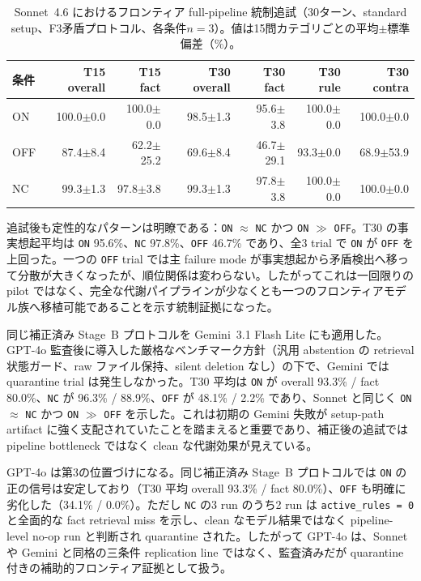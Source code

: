 \documentclass[11pt,a4paper]{article}
\begin{document}
\begin{table}[htbp]
\centering
\caption{Sonnet~4.6 におけるフロンティア full-pipeline 統制追試（30ターン、standard setup、F3矛盾プロトコル、各条件$n = 3$）。値は15問カテゴリごとの平均$\pm$標準偏差（\%）。}
\label{tab:frontier_pipeline}
\small
\begin{tabular}{lrrrrrr}
\toprule
条件 & T15 overall & T15 fact & T30 overall & T30 fact & T30 rule & T30 contra \\
\midrule
ON & 100.0$\pm$0.0 & 100.0$\pm$0.0 & 98.5$\pm$1.3 & 95.6$\pm$3.8 & 100.0$\pm$0.0 & 100.0$\pm$0.0 \\
OFF & 87.4$\pm$8.4 & 62.2$\pm$25.2 & 69.6$\pm$8.4 & 46.7$\pm$29.1 & 93.3$\pm$0.0 & 68.9$\pm$53.9 \\
NC & 99.3$\pm$1.3 & 97.8$\pm$3.8 & 99.3$\pm$1.3 & 97.8$\pm$3.8 & 100.0$\pm$0.0 & 100.0$\pm$0.0 \\
\bottomrule
\end{tabular}
\end{table}

追試後も定性的なパターンは明瞭である：\texttt{ON} $\approx$ \texttt{NC} かつ \texttt{ON} $\gg$ \texttt{OFF}。T30 の事実想起平均は \texttt{ON} 95.6\%、\texttt{NC} 97.8\%、\texttt{OFF} 46.7\% であり、全3 trial で \texttt{ON} が \texttt{OFF} を上回った。一つの \texttt{OFF} trial では主 failure mode が事実想起から矛盾検出へ移って分散が大きくなったが、順位関係は変わらない。したがってこれは一回限りの pilot ではなく、完全な代謝パイプラインが少なくとも一つのフロンティアモデル族へ移植可能であることを示す統制証拠になった。

同じ補正済み Stage~B プロトコルを Gemini~3.1 Flash Lite にも適用した。GPT-4o 監査後に導入した厳格なベンチマーク方針（汎用 abstention の retrieval 状態ガード、raw ファイル保持、silent deletion なし）の下で、Gemini では quarantine trial は発生しなかった。T30 平均は \texttt{ON} が overall 93.3\% / fact 80.0\%、\texttt{NC} が 96.3\% / 88.9\%、\texttt{OFF} が 48.1\% / 2.2\% であり、Sonnet と同じく \texttt{ON} $\approx$ \texttt{NC} かつ \texttt{ON} $\gg$ \texttt{OFF} を示した。これは初期の Gemini 失敗が setup-path artifact に強く支配されていたことを踏まえると重要であり、補正後の追試では pipeline bottleneck ではなく clean な代謝効果が見えている。

GPT-4o は第3の位置づけになる。同じ補正済み Stage~B プロトコルでは \texttt{ON} の正の信号は安定しており（T30 平均 overall 93.3\% / fact 80.0\%）、\texttt{OFF} も明確に劣化した（34.1\% / 0.0\%）。ただし \texttt{NC} の3 run のうち2 run は \texttt{active\_rules = 0} と全面的な fact retrieval miss を示し、clean なモデル結果ではなく pipeline-level no-op run と判断され quarantine された。したがって GPT-4o は、Sonnet や Gemini と同格の三条件 replication line ではなく、監査済みだが quarantine 付きの補助的フロンティア証拠として扱う。
\end{document}
